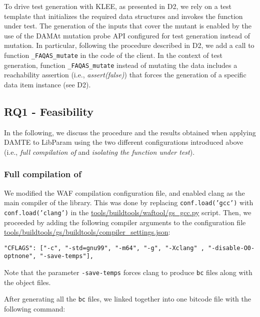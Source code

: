 To drive test generation with KLEE, as presented in D2, we rely on a test template that initializes the required data structures and invokes the function under test.
The generation of the inputs that cover the mutant is enabled by the use of the DAMAt mutation probe API configured for test generation instead of mutation.
In particular, following the procedure described in D2, we add a call to function \texttt{\_FAQAS\_mutate} in the code of the \PARAM client. In the context of test generation, function \texttt{\_FAQAS\_mutate} instead of mutating the data includes a reachability assertion (i.e., \emph{assert(false)}) that forces the generation of a specific data item instance (see D2).

\subsection{RQ1 - Feasibility}



In the following, we discuss the procedure and the results obtained when applying DAMTE to LibParam using the two different configurations introduced above  (i.e., \emph{full compilation of \PARAM} and \emph{isolating the function under test}).

\subsubsection{Full compilation of \PARAM}

We modified the WAF compilation configuration file, and enabled clang as the main compiler of the library. This was done by replacing \texttt{conf.load('gcc')} with \texttt{conf.load('clang')} in the \url{tools/buildtools/waftool/gs_gcc.py} script.
Then, we proceeded by adding the following compiler arguments to the configuration file \url{tools/buildtools/gs/buildtools/compiler_settings.json}:


\begin{lstlisting}[style=CStyle]
"CFLAGS": ["-c", "-std=gnu99", "-m64", "-g", "-Xclang" , "-disable-O0-optnone", "-save-temps"],
\end{lstlisting}

Note that the parameter \texttt{-save-temps} forces clang to produce \texttt{bc} files along with the object files.

After generating all the \texttt{bc} files, we linked together into one bitcode file with the following command:

